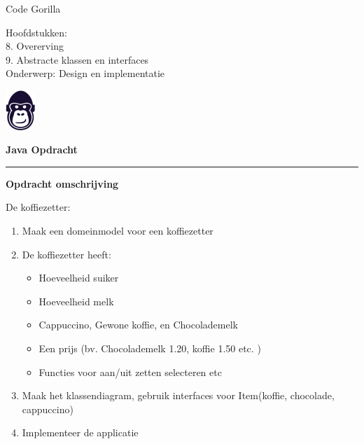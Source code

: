 \documentclass[11pt,letterpaper]{article}
\begin{document}
	\pagestyle{plain}
	\begin{flushleft}
		Code Gorilla \\
		
		\smallskip
		
		Hoofdstukken: \\
		
\hspace{1cm} 8. Overerving \\
\hspace{1cm} 9. Abstracte klassen en interfaces \\
		
		Onderwerp: Design en implementatie \\
		
	\end{flushleft}
	
	\begin{flushright}\vspace{-5mm}
		\includegraphics[height=1.5cm]{gorilla.png}
	\end{flushright}
	
	\begin{center}\vspace{-1cm}
		\textbf{ \large Java Opdracht}\\
		
	\end{center}
	
	
	\rule{\linewidth}{0.1mm}
	
	\bigskip
	\textbf{\large{Opdracht omschrijving}}
	\\
	
	\bigskip
	
	De koffiezetter: \\
	\begin{enumerate}
		\item Maak een domeinmodel voor een koffiezetter
		\item De koffiezetter heeft:
		\begin{itemize}
			\item Hoeveelheid suiker
			\item Hoeveelheid melk
			\item Cappuccino, Gewone koffie, en Chocolademelk
			\item Een prijs (bv. Chocolademelk 1.20, koffie 1.50 etc. )
			\item Functies voor aan/uit zetten selecteren etc
		\end{itemize}
		\item Maak het klassendiagram, gebruik interfaces voor Item(koffie, chocolade, cappuccino)
		\item Implementeer de applicatie
	\end{enumerate}
\end{document}
